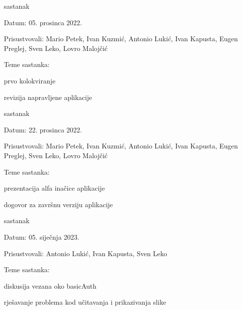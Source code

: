 \begin{packed_enum}
			\item  sastanak
			\item[] \begin{packed_item}
				\item Datum: 05. prosinca 2022.
				\item Prisustvovali: Mario Petek, Ivan Kuzmić, Antonio Lukić, Ivan Kapusta, Eugen Preglej, Sven Leko, Lovro Malojčić
				\item Teme sastanka: 
				\begin{packed_item}
					\item  prvo kolokviranje
					\item  revizija napravljene aplikacije
				\end{packed_item}
			\end{packed_item}
		
			\item  sastanak
			\item[] \begin{packed_item}
				\item Datum: 22. prosinca 2022.
				\item Prisustvovali: Mario Petek, Ivan Kuzmić, Antonio Lukić, Ivan Kapusta, Eugen Preglej, Sven Leko, Lovro Malojčić
				\item Teme sastanka: 
				\begin{packed_item}
					\item  prezentacija alfa inačice aplikacije
					\item  dogovor za završnu verziju aplikacije
				\end{packed_item}
			\end{packed_item}
		
			\item  sastanak
			\item[] \begin{packed_item}
				\item Datum: 05. siječnja 2023.
				\item Prisustvovali: Antonio Lukić, Ivan Kapusta, Sven Leko
				\item Teme sastanka: 
				\begin{packed_item}
					\item  diskusija vezana oko basicAuth
					\item  rješavanje problema kod učitavanja i prikazivanja slike
				\end{packed_item}
			\end{packed_item}
			
			
		\end{packed_enum}
		
